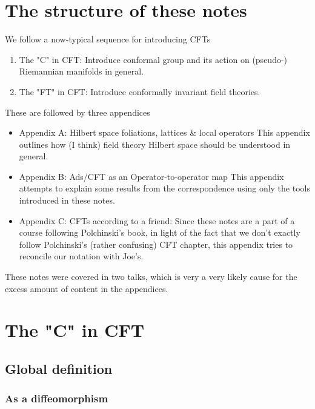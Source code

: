 
\section{The structure of these notes}

We follow a now-typical sequence for introducing CFTs

\begin{enumerate}
\item The "C" in CFT: Introduce conformal group and its action on (pseudo-)  Riemannian manifolds in general. 
\item The "FT" in CFT:  Introduce conformally invariant field theories. 
\end{enumerate}
These are followed by three appendices

\begin{itemize}

\item Appendix A: Hilbert space foliations, lattices \& local operators This appendix outlines how (I think) field theory Hilbert space should be understood in general.

\item Appendix B: Ads/CFT as an Operator-to-operator map This appendix attempts to explain some results from the correspondence using only the tools introduced in these notes.

\item Appendix C: CFTs according to a friend:   Since these notes are a part of a course following Polchinski's book, in light of the fact that we don't exactly follow Polchinski's (rather confusing) CFT chapter, this appendix tries to reconcile our notation with Joe's. 

\end{itemize}

These notes were covered in two talks, which is very a very likely cause for the excess amount of content in the appendices.


\section{The "C" in CFT}


\subsection{ Global definition }

\subsubsection{ As a diffeomorphism}

